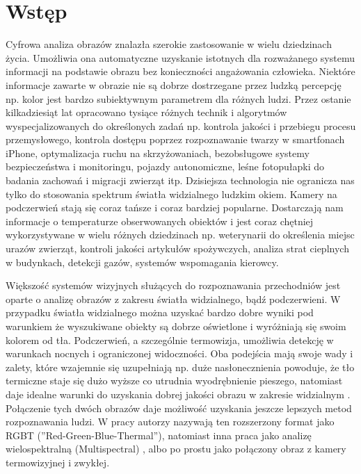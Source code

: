 \chapter{Wstęp}
\label{cha:wstep}

Cyfrowa analiza obrazów znalazła szerokie zastosowanie w wielu dziedzinach życia. 
Umożliwia ona automatyczne uzyskanie istotnych dla rozważanego systemu informacji na podstawie obrazu bez konieczności angażowania człowieka.
Niektóre informacje zawarte w obrazie nie są dobrze dostrzegane przez ludzką percepcję np. kolor jest bardzo subiektywnym parametrem dla różnych ludzi. %
Przez ostanie kilkadziesiąt lat opracowano tysiące różnych technik i algorytmów wyspecjalizowanych do określonych zadań np. kontrola jakości i przebiegu procesu przemysłowego, kontrola dostępu poprzez rozpoznawanie twarzy w smartfonach iPhone, optymalizacja ruchu na skrzyżowaniach, bezobsługowe systemy bezpieczeństwa i monitoringu, pojazdy autonomiczne, leśne fotopułapki do badania zachowań i migracji zwierząt itp. 
Dzisiejsza technologia nie ogranicza nas tylko do stosowania spektrum światła widzialnego ludzkim okiem. 
Kamery na podczerwień stają się coraz tańsze i coraz bardziej popularne.
Dostarczają nam informacje o temperaturze obserwowanych obiektów i jest coraz chętniej wykorzystywane w wielu różnych dziedzinach np. weterynarii do określenia miejsc urazów zwierząt, kontroli jakości artykułów spożywczych, analiza strat cieplnych w budynkach, detekcji gazów, systemów wspomagania kierowcy\cite{gade2014thermal}. 

Większość systemów wizyjnych służących do rozpoznawania przechodniów jest oparte o analizę obrazów z zakresu światła widzialnego, bądź podczerwieni. 
W przypadku światła widzialnego można uzyskać bardzo dobre wyniki pod warunkiem że wyszukiwane obiekty są dobrze oświetlone i wyróżniają się swoim kolorem od tła. 
Podczerwień, a szczególnie termowizja, umożliwia detekcję w warunkach nocnych i ograniczonej widoczności. %
Oba podejścia mają swoje wady i zalety, które wzajemnie się uzupełniają np. duże nasłonecznienia powoduje, że tło termiczne staje się dużo wyższe co utrudnia wyodrębnienie pieszego, natomiast daje idealne warunki do uzyskania dobrej jakości obrazu w zakresie widzialnym \cite{lee2015robust}. 
Połączenie tych dwóch obrazów daje możliwość uzyskania jeszcze lepszych metod rozpoznawania ludzi. %
W pracy \cite{st2007combination} autorzy nazywają ten rozszerzony format jako RGBT (''Red-Green-Blue-Thermal''), natomiast inna praca jako analizę wielospektralną (Multispectral) \cite{hwang2015multispectral}, albo po prostu jako połączony obraz z kamery termowizyjnej i zwykłej\cite{lee2015robust}. 

